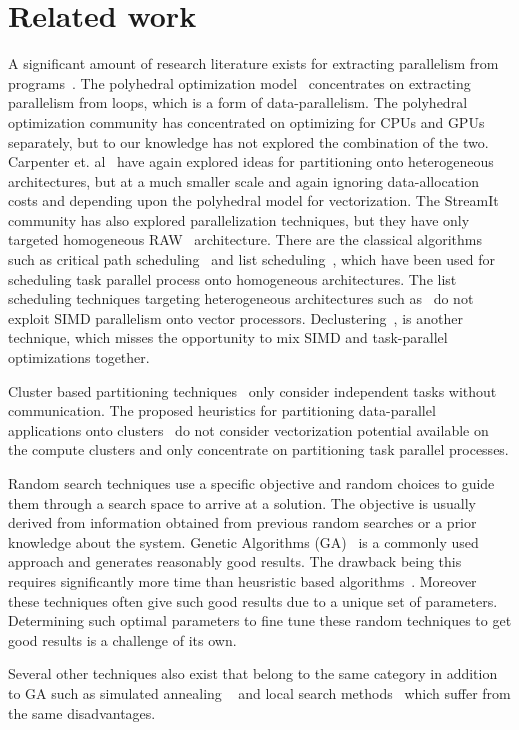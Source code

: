 \section{Related work}
\label{sec:related-work}

A significant amount of research literature exists for extracting
parallelism from programs~\cite{mgri98,jdon06,mgor06,gsih93,pcar09}. The
polyhedral optimization model~\cite{mgri98} concentrates on extracting
parallelism from loops, which is a form of data-parallelism. The
polyhedral optimization community has concentrated on optimizing for
CPUs and GPUs separately, but to our knowledge has not explored the
combination of the two. Carpenter et. al~\cite{pcar09} have again
explored ideas for partitioning onto heterogeneous architectures, but at
a much smaller scale and again ignoring data-allocation costs and
depending upon the polyhedral model for vectorization. The
StreamIt~\cite{wthi02} community has also explored parallelization
techniques, but they have only targeted homogeneous RAW~\cite{ewai97}
architecture. There are the classical algorithms such as critical path
scheduling~\cite{Kohler1975} and list scheduling~\cite{atho74}, which
have been used for scheduling task parallel process onto homogeneous
architectures. The list scheduling techniques targeting heterogeneous
architectures such as~\cite{htop02} do not exploit SIMD parallelism onto
vector processors. Declustering~\cite{gsih93}, is another technique,
which misses the opportunity to mix SIMD and task-parallel optimizations
together.

Cluster based partitioning techniques~\cite{mmah99,adou04,tbra01} only
consider independent tasks without communication. The proposed
heuristics for partitioning data-parallel applications onto
clusters~\cite{ssan05,skum02} do not consider vectorization potential
available on the compute clusters and only concentrate on partitioning
task parallel processes.

Random search techniques use a specific objective and random choices to
guide them through a search space to arrive at a solution. The objective
is usually derived from information obtained from previous random
searches or a prior knowledge about the system. Genetic Algorithms
(GA)~\cite{265940,shroff1996genetic,singh1995mapping,wang1996genetic} is
a commonly used approach and generates reasonably good results. The
drawback being this requires significantly more time than heusristic
based algorithms~\cite{tbra01}. Moreover these techniques often give
such good results due to a unique set of parameters. Determining such
optimal parameters to fine tune these random techniques to get good
results is a challenge of its own. %

Several other techniques also exist that belong to the same category in
addition to GA such as simulated annealing ~\cite{shroff1996genetic,664363} and
local search methods~\cite{622584,537394} which suffer from the same
disadvantages.



